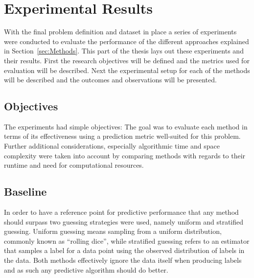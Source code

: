 
\thispagestyle{empty}

\section{Experimental Results}
\label{sec:Experimental Results}

With the final problem definition and dataset in place a series of experiments were conducted to evaluate the performance of the different approaches explained in Section~\ref{sec:Methods}.
This part of the thesis lays out these experiments and their results. First the research objectives will be defined and the metrics used for evaluation will be described. Next the experimental setup for each of the methods will be described and the outcomes and observations will be presented.

\subsection{Objectives}
\label{sub:Objectives}

The experiments had simple objectives: The goal was to evaluate each method in terms of its effectiveness using a prediction metric well-suited for this problem. Further additional considerations, especially algorithmic time and space complexity were taken into account by comparing methods with regards to their runtime and need for computational resources.





\subsection{Baseline}
\label{sub:Baseline}

In order to have a reference point for predictive performance that any method should surpass two guessing strategies were used, namely uniform and stratified guessing. Uniform guessing means sampling from a uniform distribution, commonly known as ``rolling dice'', while stratified guessing refers to an estimator that samples a label for a data point using the observed distribution of labels in the data. Both methods effectively ignore the data itself when producing labels and as such any predictive algorithm should do better.

